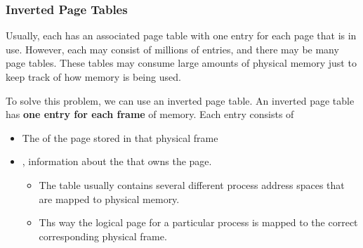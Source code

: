 \subsubsection{Inverted Page Tables}\label{subsubsec:Inverted_Page_Tables}
Usually, each  has an associated page table with one entry for each page that is in use.
However, each  may consist of millions of entries, and there may be many page tables.
These tables may consume large amounts of physical memory just to keep track of how memory is being used.

To solve this problem, we can use an inverted page table.
An inverted page table has \textbf{one entry for each frame} of memory.
Each entry consists of
\begin{itemize}[noitemsep]
\item The  of the page stored in that physical frame
\item {}, information about the  that owns the page.
  \begin{itemize}[noitemsep]
  \item The table usually contains several different process address spaces that are mapped to physical memory.
  \item Ths way the logical page for a particular process is mapped to the correct corresponding physical frame.
  \end{itemize}
\end{itemize}


